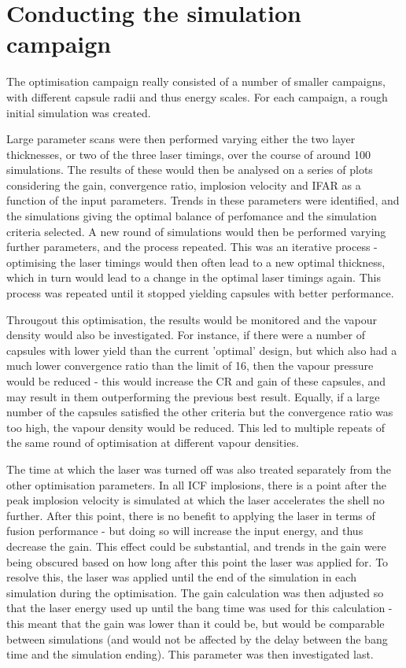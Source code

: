 \section{Conducting the simulation campaign}

The optimisation campaign really consisted of a number of smaller campaigns, with different capsule radii and thus energy scales. For each campaign, a rough initial simulation was created. 

Large parameter scans were then performed varying either the two layer thicknesses, or two of the three laser timings, over the course of around 100 simulations. The results of these would then be analysed on a series of plots considering the gain, convergence ratio, implosion velocity and IFAR as a function of the input parameters. Trends in these parameters were identified, and the simulations giving the optimal balance of perfomance and the simulation criteria selected. A new round of simulations would then be performed varying further parameters, and the process repeated. This was an iterative process - optimising the laser timings would then often lead to a new optimal thickness, which in turn would lead to a change in the optimal laser timings again. This process was repeated until it stopped yielding capsules with better performance.

Througout this optimisation, the results would be monitored and the vapour density would also be investigated. For instance, if there were a number of capsules with lower yield than the current 'optimal' design, but which also had a much lower convergence ratio than the limit of 16, then the vapour pressure would be reduced - this would increase the CR and gain of these capsules, and may result in them outperforming the previous best result. Equally, if a large number of the capsules satisfied the other criteria but the convergence ratio was too high, the vapour density would be reduced. This led to multiple repeats of the same round of optimisation at different vapour densities.

The time at which the laser was turned off was also treated separately from the other optimisation parameters. In all ICF implosions, there is a point after the peak implosion velocity is simulated at which the laser accelerates the shell no further. After this point, there is no benefit to applying the laser in terms of fusion performance - but doing so will increase the input energy, and thus decrease the gain. This effect could be substantial, and trends in the gain were being obscured based on how long after this point the laser was applied for. To resolve this, the laser was applied until the end of the simulation in each simulation during the optimisation. The gain calculation was then adjusted so that the laser energy used up until the bang time was used for this calculation - this meant that the gain was lower than it could be, but would be comparable between simulations (and would not be affected by the delay between the bang time and the simulation ending). This parameter was then investigated last.

